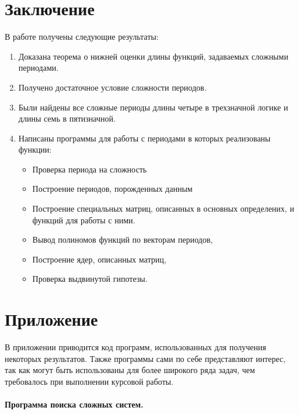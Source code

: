 \documentclass[bibliography=totoc, a4paper, 12pt]{extarticle}
\let\stdsection\section
\renewcommand\section{\newpage\stdsection}
\begin{document}
\section{Заключение}
В работе получены следующие результаты:
\begin{enumerate}
\item Доказана теорема о нижней оценки длины функций, задаваемых сложными периодами.

\item Получено достаточное условие сложности периодов.

\item Были найдены все сложные периоды длины четыре в трехзначной логике и длины семь в пятизначной.

\item Написаны программы для работы с периодами в которых реализованы функции:
\begin{itemize}
\item Проверка периода на сложность
\item Построение периодов, порожденных данным
\item Построение специальных матриц, описанных в основных определених,
и функций для работы с ними.
\item Вывод полиномов функций по векторам периодов,
\item Построение ядер, описанных матриц,
\item Проверка выдвинутой гипотезы.
\end{itemize}
\end{enumerate}


\section{Приложение}

В приложении приводится код программ, использованных для получения некоторых
результатов. Также программы сами по себе представляют интерес, так как могут
быть использованы для более широкого ряда задач, чем требовалось при
выполнении курсовой работы.

\paragraph{Программа поиска сложных систем.}
\end{document}
